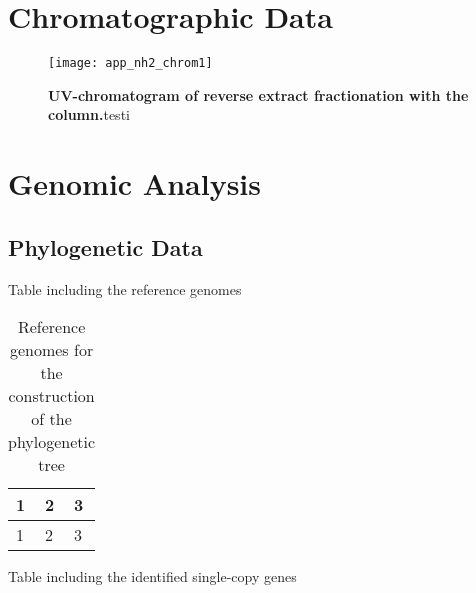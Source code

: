 
\section{Chromatographic Data}
\label{sec:chromatographic_data}

\begin{figure}[htbp]
	\texttt{[image: app\_nh2\_chrom1]}
	\caption[UV-chromatogram of reverse extract fractionation with the \luna column.]{\textbf{UV-chromatogram of reverse extract fractionation with the \luna column.}testi}
	\label{fig:app_nh2_chrom1}
\end{figure}	

\section{Genomic Analysis} %
\label{sec:genomic_analysis}

\subsection{Phylogenetic Data}
	
	Table including the reference genomes
	
	\begin{table}[htbp]
		\caption{Reference genomes for the construction of the phylogenetic tree}
		\label{tab:ref_genomes}
		\centering
		\begin{tabularx}{\textwidth}{XXX}
			\toprule
			\textbf{1} 			& \textbf{2}		& \textbf{3}		\\
			\midrule
			1	&	2	& 3 \\
			\bottomrule
		\end{tabularx}
	\end{table}

	Table including the identified single-copy genes
	
